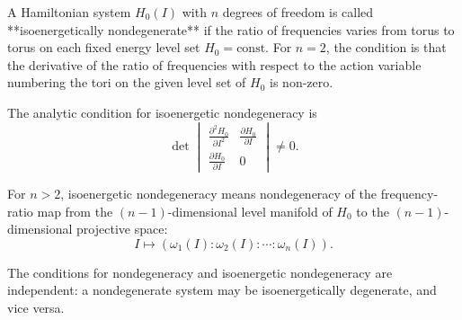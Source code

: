 A Hamiltonian system $H_0(I)$ with $n$ degrees of freedom is called **isoenergetically nondegenerate** if the ratio of frequencies varies from torus to torus on each fixed energy level set $H_0 = \text{const}$. For $n = 2$, the condition is that the derivative of the ratio of frequencies with respect to the action variable numbering the tori on the given level set of $H_0$ is non-zero.

The analytic condition for isoenergetic nondegeneracy is
$$\det \begin{vmatrix}
\frac{\partial^2 H_0}{\partial I^2} & \frac{\partial H_0}{\partial I} \\[4pt]
\frac{\partial H_0}{\partial I} & 0
\end{vmatrix} \neq 0.$$

For $n > 2$, isoenergetic nondegeneracy means nondegeneracy of the frequency-ratio map from the $(n-1)$-dimensional level manifold of $H_0$ to the $(n-1)$-dimensional projective space:
$$I \mapsto (\omega_1(I) : \omega_2(I) : \cdots : \omega_n(I)).$$

The conditions for nondegeneracy and isoenergetic nondegeneracy are independent: a nondegenerate system may be isoenergetically degenerate, and vice versa.
